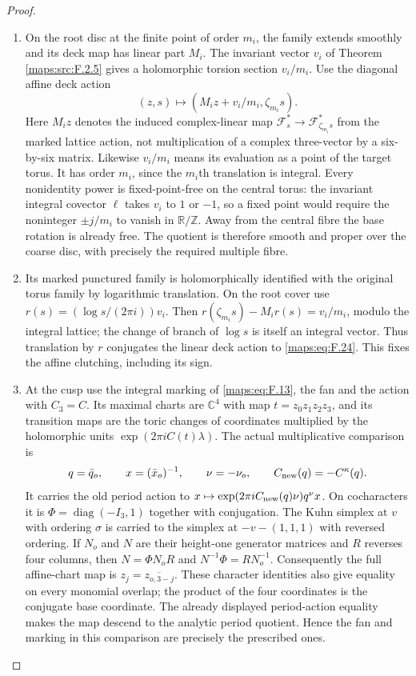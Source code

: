 \begin{proof}
\begin{enumerate}[label=\arabic*.]
\item On the root disc at the finite point of order $m_i$, the family
extends smoothly and its deck map has linear part $M_i$.
The invariant vector $v_i$ of Theorem \ref{maps:src:F.2.5} gives a holomorphic
torsion section $v_i/m_i$.  Use the diagonal affine deck action
\[
 (z,s)\longmapsto(M_i z+v_i/m_i,\zeta_{m_i}s).
 \tag{F.24}\label{maps:eq:F.24}
\]
Here $M_i z$ denotes the induced complex-linear map
$\mathcal F_s^*\to\mathcal F_{\zeta_{m_i}s}^*$ from the marked
lattice action, not multiplication of a complex three-vector
by a six-by-six matrix.  Likewise $v_i/m_i$ means its evaluation
as a point of the target torus.
It has order $m_i$, since the $m_i$th translation is integral.
Every nonidentity power is fixed-point-free on the central
torus: the invariant integral covector $\ell$ takes $v_i$ to
$1$ or $-1$, so a fixed point would require the noninteger
$\pm j/m_i$ to vanish in $\mathbb R/\mathbb Z$.
Away from the central fibre the base rotation is already free.
The quotient is therefore smooth and proper over the coarse
disc, with precisely the required multiple fibre.

\item Its marked punctured family is holomorphically identified with
the original torus family by logarithmic translation.  On the
root cover use $r(s)=(\log s/(2\pi i))v_i$.  Then
$r(\zeta_{m_i}s)-M_i r(s)=v_i/m_i$, modulo the integral lattice;
the change of branch of $\log s$ is itself an integral vector.
Thus translation by $r$ conjugates the linear deck action to
\eqref{maps:eq:F.24}.  This fixes the affine clutching, including its sign.

\item At the cusp use the integral marking of \eqref{maps:eq:F.13}, the fan 
and the action  with $C_3=C$.
Its maximal charts are $\mathbb C^4$ with map
$t=z_0z_1z_2z_3$, and its transition maps are the toric changes
of coordinates multiplied by the holomorphic units
$\exp(2\pi i C(t)\lambda)$.
The actual multiplicative comparison is
\[
 q=\bar q_o,\qquad x=(\bar x_o)^{-1},\qquad
 \nu=-\nu_o,
 \qquad C_{\rm new}(q)=-C^\kappa(q).
\]
It carries the old period action to
$x\mapsto\exp(2\pi iC_{\rm new}(q)\nu)q^\nu x$.
On cocharacters it is
$\Phi=\operatorname{diag}(-I_3,1)$ together with conjugation.
The Kuhn simplex at $v$ with ordering $\sigma$ is carried to
the simplex at $-v-(1,1,1)$ with reversed ordering.
If $N_o$ and $N$ are their height-one generator matrices and
$R$ reverses four columns, then
$N=\Phi N_oR$ and $N^{-1}\Phi=RN_o^{-1}$.
Consequently the full affine-chart map is
$z_j=\overline{z_{o,3-j}}$.  These character identities also
give equality on every monomial overlap; the product of the
four coordinates is the conjugate base coordinate.
The already displayed period-action equality makes the map
descend to the analytic period quotient.  Hence the fan and
marking in this comparison are precisely the prescribed ones.


\end{enumerate}
\end{proof}

